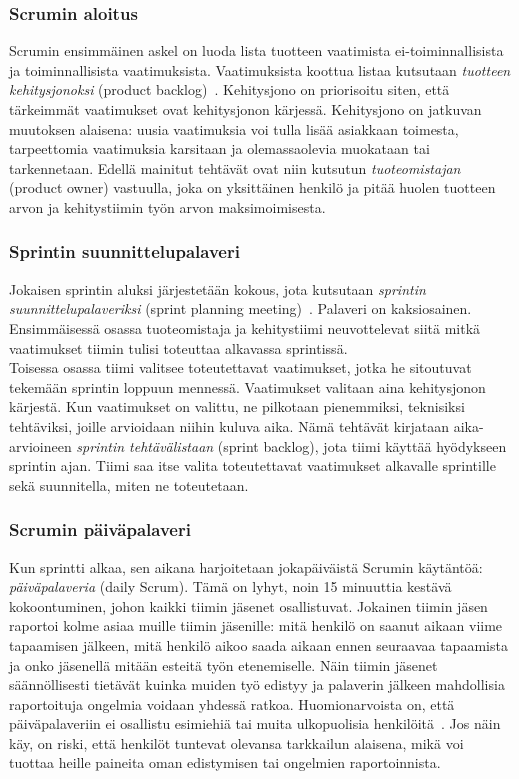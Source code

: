 \documentclass[finnish]{../tktltiki2}
\theoremstyle{definition}
\theoremstyle{remark}
\begin{document}
\subsubsection{Scrumin aloitus}

Scrumin ensimmäinen askel on luoda lista tuotteen vaatimista
ei-toiminnalli\-sista ja toiminnallisista vaatimuksista. Vaatimuksista
koottua listaa kutsutaan \emph{tuotteen kehitysjonoksi} (product backlog)~\cite{ScrumFinnishGuide}. Kehitysjono on priorisoitu siten, että tärkeimmät vaatimukset ovat kehitysjonon kärjessä. Kehitysjono on jatkuvan muutoksen alaisena: uusia vaatimuksia
voi tulla lisää asiakkaan toimesta, tarpeettomia vaatimuksia karsitaan ja olemassaolevia muokataan tai tarkennetaan. Edellä mainitut tehtävät
ovat niin kutsutun \emph{tuoteomistajan} (product owner) vastuulla,
joka on yksittäinen henkilö ja pitää huolen tuotteen arvon ja kehitystiimin työn arvon maksimoimisesta.

\subsubsection{Sprintin suunnittelupalaveri}

\enlargethispage{\baselineskip}

Jokaisen sprintin aluksi järjestetään kokous, jota kutsutaan \emph{sprintin suunnittelupalaveriksi} (sprint planning meeting)~\cite{ScrumHandBook}. Palaveri on kaksiosainen.
Ensimmäisessä osassa tuoteomistaja ja kehitystiimi neuvottelevat
siitä mitkä vaatimukset tiimin tulisi toteuttaa alkavassa
sprintissä.\\

Toisessa osassa tiimi valitsee toteutettavat vaatimukset, jotka
he sitoutuvat tekemään sprintin loppuun mennessä. Vaatimukset
valitaan aina kehitysjonon kärjestä.
Kun vaatimukset on valittu, ne pilkotaan pienemmiksi, teknisiksi
tehtäviksi, joille arvioidaan niihin kuluva aika. Nämä tehtävät kirjataan aika-arvioineen \emph{sprintin tehtävälistaan} (sprint backlog), jota tiimi käyttää hyödykseen sprintin ajan. Tiimi saa itse valita toteutettavat vaatimukset alkavalle sprintille sekä suunnitella, miten ne toteutetaan.

\subsubsection{Scrumin päiväpalaveri}

Kun sprintti alkaa, sen aikana harjoitetaan jokapäiväistä Scrumin käytäntöä:
\emph{päiväpalaveria} (daily Scrum). Tämä on lyhyt, noin 15 minuuttia kestävä kokoontuminen, johon
kaikki tiimin jäsenet osallistuvat. Jokainen tiimin jäsen raportoi kolme asiaa muille tiimin jäsenille:
mitä henkilö on saanut aikaan viime tapaamisen jälkeen, mitä henkilö
aikoo saada aikaan ennen seuraavaa tapaamista ja onko jäsenellä mitään
esteitä työn etenemiselle. Näin tiimin jäsenet säännöllisesti tietävät
kuinka muiden työ edistyy ja palaverin jälkeen mahdollisia raportoituja
ongelmia voidaan yhdessä ratkoa. Huomionarvoista on, että päiväpalaveriin ei osallistu esimiehiä tai muita
ulkopuolisia henkilöitä~\cite{ScrumHandBook}. Jos näin käy, on riski,
että henkilöt tuntevat olevansa tarkkailun alaisena, mikä voi
tuottaa heille paineita oman edistymisen tai ongelmien raportoinnista.
\end{document}
